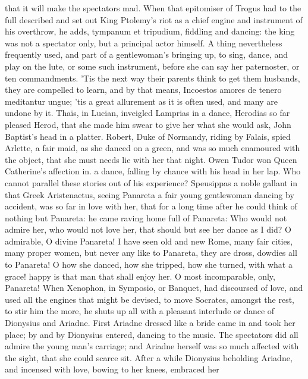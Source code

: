 that it will make the spectators mad. When that epitomiser of
Trogus had to the full described and set out King Ptolemy's riot
as a chief engine and instrument of his overthrow, he adds, tympanum et
tripudium, fiddling and dancing: the king was not a spectator only, but
a principal actor himself. A thing nevertheless frequently used, and
part of a gentlewoman's bringing up, to sing, dance, and play on the
lute, or some such instrument, before she can say her paternoster, or
ten commandments. 'Tis the next way their parents think to get them
husbands, they are compelled to learn, and by that means,
Incoestos amores de tenero meditantur ungue; 'tis a great
allurement as it is often used, and many are undone by it. Thaïs, in
Lucian, inveigled Lamprias in a dance, Herodias so far pleased Herod,
that she made him swear to give her what she would ask, John Baptist's
head in a platter. Robert, Duke of Normandy, riding by Falais,
spied Arlette, a fair maid, as she danced on a green, and was so much
enamoured with the object, that she must needs lie with her that
night. Owen Tudor won Queen Catherine's affection in. a dance, falling
by chance with his head in her lap. Who cannot parallel these stories
out of his experience? Speusippas a noble gallant in that Greek
Aristenaetus, seeing Panareta a fair young gentlewoman dancing by
accident, was so far in love with her, that for a long time after he
could think of nothing but Panareta: he came raving home full of
Panareta: Who would not admire her, who would not love her, that should
but see her dance as I did? O admirable, O divine Panareta! I have seen
old and new Rome, many fair cities, many proper women, but never any
like to Panareta, they are dross, dowdies all to Panareta! O how she
danced, how she tripped, how she turned, with what a grace! happy is
that man that shall enjoy her. O most incomparable, only, Panareta!
When Xenophon, in Symposio, or Banquet, had discoursed of love, and
used all the engines that might be devised, to move Socrates, amongst
the rest, to stir him the more, he shuts up all with a pleasant
interlude or dance of Dionysius and Ariadne. First Ariadne
dressed like a bride came in and took her place; by and by Dionysius
entered, dancing to the music. The spectators did all admire the young
man's carriage; and Ariadne herself was so much affected with the
sight, that she could scarce sit. After a while Dionysius beholding
Ariadne, and incensed with love, bowing to her knees, embraced her
